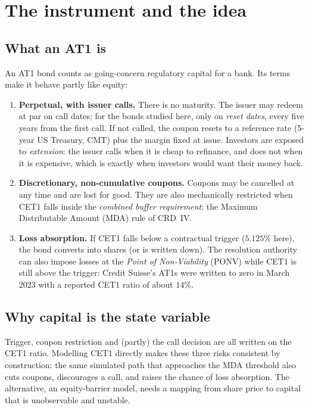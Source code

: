 \documentclass[11pt]{article}
\newcommand{\1}{\mathbf{1}}
\begin{document}
\section{The instrument and the idea}

\subsection{What an AT1 is}
An AT1 bond counts as going-concern regulatory capital for a bank. Its terms
make it behave partly like equity:
\begin{enumerate}
  \item \textbf{Perpetual, with issuer calls.} There is no maturity. The issuer
  may redeem at par on call dates; for the bonds studied here, only on
  \emph{reset dates}, every five years from the first call. If not called, the
  coupon resets to a reference rate (5-year US Treasury, CMT) plus the margin
  fixed at issue. Investors are exposed to \emph{extension}: the issuer calls
  when it is cheap to refinance, and does not when it is expensive, which is
  exactly when investors would want their money back.
  \item \textbf{Discretionary, non-cumulative coupons.} Coupons may be cancelled
  at any time and are lost for good. They are also mechanically restricted when
  CET1 falls inside the \emph{combined buffer requirement}: the Maximum
  Distributable Amount (MDA) rule of CRD~IV.
  \item \textbf{Loss absorption.} If CET1 falls below a contractual trigger
  ($5.125\%$ here), the bond converts into shares (or is written down). The
  resolution authority can also impose losses at the \emph{Point of
  Non-Viability} (PONV) while CET1 is still above the trigger: Credit Suisse's
  AT1s were written to zero in March 2023 with a reported CET1 ratio of about $14\%$.
\end{enumerate}

\subsection{Why capital is the state variable}
Trigger, coupon restriction and (partly) the call decision are all written on
the CET1 ratio. Modelling CET1 directly makes these three risks consistent by
construction: the same simulated path that approaches the MDA threshold also
cuts coupons, discourages a call, and raises the chance of loss absorption.
The alternative, an equity-barrier model, needs a mapping from share price to
capital that is unobservable and unstable.
\end{document}
